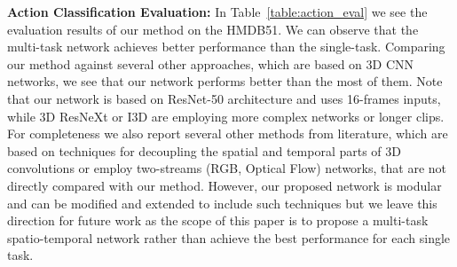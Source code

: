 \documentclass[10pt,twocolumn,letterpaper]{article}
\begin{document}
\begin{table}[t]
\vspace{0.1cm}
\caption{Evaluation results for the action recognition task over all splits of HMDB51. The proposed multi-task SUSiNet outperforms the single-task as well as several state-of-the-art methods that rely on 3D convolutions. 
}
\label{table:action_eval}
\end{table}

\noindent\textbf{Action Classification Evaluation:} In Table~\ref{table:action_eval} we see the evaluation results of our method on the HMDB51. We can observe that the multi-task network achieves better performance than the single-task. Comparing our method against several other approaches, which are based on 3D CNN networks, we see that our network performs better than the most of them. Note that our network is based on ResNet-50 architecture and uses 16-frames inputs, while 3D ResNeXt or I3D are employing more complex networks or longer clips. For completeness we also report several other methods from literature, which are based on techniques for decoupling the spatial and temporal parts of 3D convolutions or employ two-streams (RGB, Optical Flow) networks, that are not directly compared with our method. However, our proposed network is modular and can be modified and extended to include such techniques but we leave this direction for future work as the scope of this paper is to propose a multi-task spatio-temporal network rather than achieve the best performance for each single task. 
\end{document}
